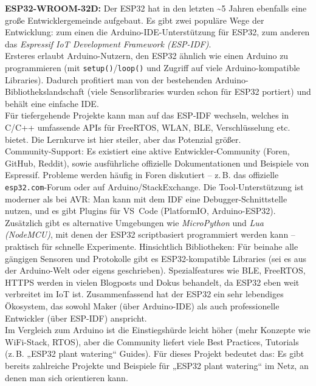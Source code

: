\noindent\textbf{ESP32-WROOM-32D:} Der ESP32 hat in den letzten \textasciitilde5 Jahren ebenfalls eine große Entwicklergemeinde aufgebaut. Es gibt zwei populäre Wege der Entwicklung: zum einen die Arduino-IDE-Unterstützung für ESP32, zum anderen das \textit{Espressif IoT Development Framework (ESP-IDF)}. \autocite{esp32_comparison} 
\\
Ersteres erlaubt Arduino-Nutzern, den ESP32 ähnlich wie einen Arduino zu programmieren (mit \texttt{setup()}/\texttt{loop()} und Zugriff auf viele Arduino-kompatible Libraries). Dadurch profitiert man von der bestehenden Arduino-Bibliothekslandschaft (viele Sensorlibraries wurden schon für ESP32 portiert) und behält eine einfache IDE. 
\\
Für tiefergehende Projekte kann man auf das ESP-IDF wechseln, welches in C/C++ umfassende APIs für FreeRTOS, WLAN, BLE, Verschlüsselung etc. bietet. Die Lernkurve ist hier steiler, aber das Potenzial größer. 
\\
Community-Support: Es existiert eine aktive Entwickler-Community (Foren, GitHub, Reddit), sowie ausführliche offizielle Dokumentationen und Beispiele von Espressif. \autocite{esp32_comparison} Probleme werden häufig in Foren diskutiert – z.\,B. das offizielle \texttt{esp32.com}-Forum oder auf Arduino/StackExchange. Die Tool-Unterstützung ist moderner als bei AVR: Man kann mit dem IDF eine Debugger-Schnittstelle nutzen, und es gibt Plugins für VS~Code (PlatformIO, Arduino-ESP32). 
\\
Zusätzlich gibt es alternative Umgebungen wie \textit{MicroPython} und \textit{Lua (NodeMCU)}, mit denen der ESP32 scriptbasiert programmiert werden kann – praktisch für schnelle Experimente. Hinsichtlich Bibliotheken: Für beinahe alle gängigen Sensoren und Protokolle gibt es ESP32-kompatible Libraries (sei es aus der Arduino-Welt oder eigens geschrieben). Spezialfeatures wie BLE, FreeRTOS, HTTPS werden in vielen Blogposts und Dokus behandelt, da ESP32 eben weit verbreitet im IoT ist. Zusammenfassend hat der ESP32 ein sehr lebendiges Ökosystem, das sowohl Maker (über Arduino-IDE) als auch professionelle Entwickler (über ESP-IDF) anspricht. \autocite{esp32_comparison} 
\\
Im Vergleich zum Arduino ist die Einstiegshürde leicht höher (mehr Konzepte wie WiFi-Stack, RTOS), aber die Community liefert viele Best Practices, Tutorials (z.\,B. „ESP32 plant watering“ Guides). Für dieses Projekt bedeutet das: Es gibt bereits zahlreiche Projekte und Beispiele für „ESP32 plant watering“ im Netz, an denen man sich orientieren kann.


